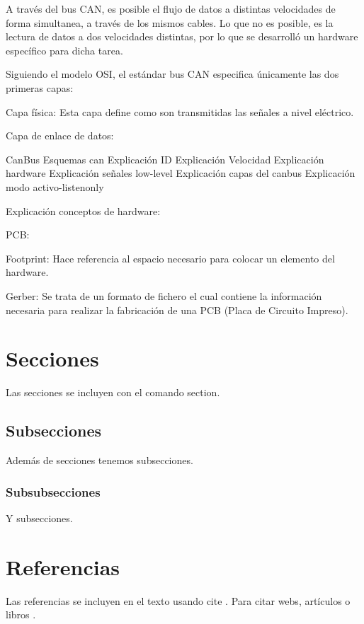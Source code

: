 A través del bus CAN, es posible el flujo de datos a distintas velocidades de forma simultanea, a través de los mismos cables. Lo que no es posible, es la lectura de datos a dos velocidades distintas, por lo que se desarrolló un hardware específico para dicha tarea.



Siguiendo el modelo OSI, el estándar bus CAN especifica únicamente las dos primeras capas:

Capa física: Esta capa define como son transmitidas las señales a nivel eléctrico. 

Capa de enlace de datos:


CanBus
Esquemas can
Explicación ID
Explicación Velocidad
Explicación hardware
Explicación señales low-level
Explicación capas del canbus
Explicación modo activo-listenonly

Explicación conceptos de hardware:

PCB:


Footprint: Hace referencia al espacio necesario para colocar un elemento del hardware.

Gerber: Se trata de un formato de fichero el cual contiene la información necesaria para realizar la fabricación de una PCB (Placa de Circuito Impreso).


\section{Secciones}

Las secciones se incluyen con el comando section.

\subsection{Subsecciones}

Además de secciones tenemos subsecciones.

\subsubsection{Subsubsecciones}

Y subsecciones. 


\section{Referencias}

Las referencias se incluyen en el texto usando cite \cite{wiki:latex}. Para citar webs, artículos o libros \cite{koza92}.


